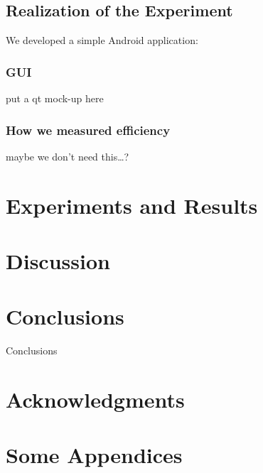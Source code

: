 \documentclass{sig-alternate-05-2015}
\begin{document}
\subsection{Realization of the Experiment}
We developed a simple Android application:
\subsubsection{GUI}
put a qt mock-up here
\subsubsection{How we measured efficiency}
maybe we don't need this\ldots?
\section{Experiments and Results}
\section{Discussion}

\section{Conclusions}
Conclusions

\section{Acknowledgments}

%

%
%
\appendix
\section{Some Appendices}
\end{document}
